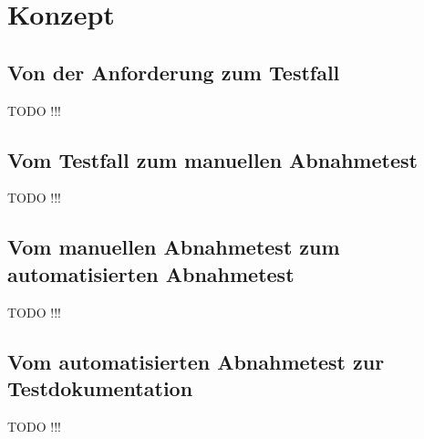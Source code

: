 \chapter{Konzept}
\label{cha:Konzept}

\section{Von der Anforderung zum Testfall}

TODO !!!

\section{Vom Testfall zum manuellen Abnahmetest}

TODO !!!

\section{Vom manuellen Abnahmetest zum automatisierten Abnahmetest}

TODO !!!

\section{Vom automatisierten Abnahmetest zur Testdokumentation}

TODO !!!
